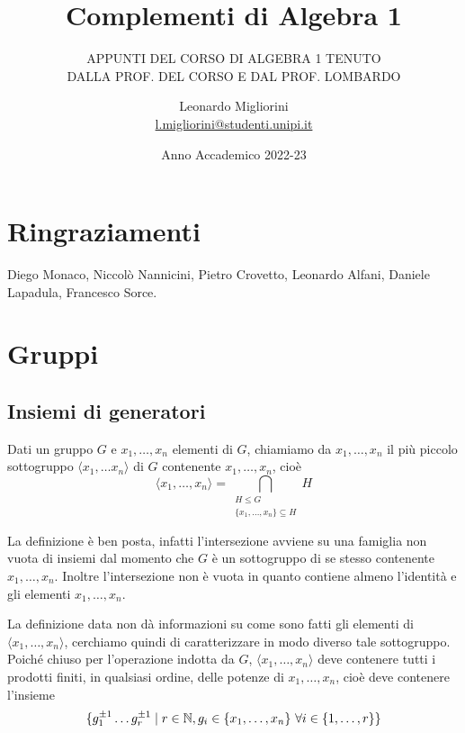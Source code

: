 \documentclass[11pt]{scrartcl}
\begin{document}
\title{Complementi di Algebra 1}
\subtitle{\large\normalfont\rmfamily\scshape APPUNTI DEL CORSO DI ALGEBRA 1 TENUTO\\ DALLA PROF. DEL CORSO E DAL PROF. LOMBARDO}
\author{Leonardo Migliorini \\ \textnormal{\href{l.migliorini@studenti.unipi.it}{l.migliorini@studenti.unipi.it}}}
\date{Anno Accademico 2022-23}
\maketitle
\newpage

\tableofcontents
\newpage

\section*{Ringraziamenti}

Diego Monaco, Niccolò Nannicini, Pietro Crovetto, Leonardo Alfani, Daniele
Lapadula, Francesco Sorce.

\newpage

\section{Gruppi}

\subsection{Insiemi di generatori}

\begin{definition}
    Dati un gruppo $G$ e $x_1, \ldots, x_n$ elementi di $G$, chiamiamo  da $x_1, \ldots, x_n$ il più piccolo sottogruppo $\langle x_1, \ldots x_n
    \rangle$ di $G$ contenente $x_1, \ldots, x_n$, cioè \[\langle x_1, \ldots, x_n\rangle =
    \bigcap_{\substack{H\leqslant G\\ \{x_1, \ldots, x_n\} \subseteq H}} H\] 
\end{definition}

\begin{remark}
    La definizione è ben posta, infatti l'intersezione avviene su una 
    famiglia non vuota di insiemi dal momento che $G$ è un sottogruppo di 
    se stesso contenente $x_1, \ldots, x_n$. Inoltre l'intersezione non è vuota in 
    quanto contiene almeno l'identità e gli elementi $x_1, \ldots, x_n$.
\end{remark}

La definizione data non dà informazioni su come sono fatti gli elementi di 
$\langle x_1, \ldots, x_n\rangle$, cerchiamo quindi di caratterizzare in modo
diverso tale sottogruppo. Poiché chiuso per l'operazione indotta da $G$, $\langle x_1, \ldots, x_n\rangle$
deve contenere tutti i prodotti finiti, in qualsiasi ordine, delle potenze di
$x_1, \ldots, x_n$, cioè deve contenere l'insieme 
\[\{g_1^{\pm 1} \ldots g_r^{\pm 1}\mid r \in \mathbb N, g_i \in \{x_1, \ldots, x_n\}
~\forall i \in \{1, \ldots, r\}\}\]
\end{document}
